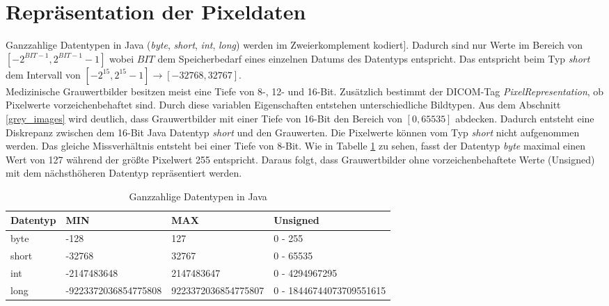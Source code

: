 \FloatBarrier
\section{Repräsentation der Pixeldaten}

Ganzzahlige Datentypen in Java (\textit{byte}, \textit{short}, \textit{int}, \textit{long}) werden im Zweierkomplement kodiert\cite[S.106]{java:insel}]. Dadurch sind nur Werte im Bereich von $[-2^{BIT-1}, 2^{BIT-1}-1]$ wobei $BIT$ dem Speicherbedarf eines einzelnen Datums des Datentyps entspricht. Das entspricht beim Typ \textit{short} dem Intervall von $[-2^{15}, 2^{15}-1] \rightarrow [-32768, 32767]$.\\
Medizinische Grauwertbilder besitzen meist eine Tiefe von 8-, 12- und 16-Bit. Zusätzlich bestimmt der DICOM-Tag \textit{PixelRepresentation}, ob Pixelwerte vorzeichenbehaftet sind. Durch diese variablen Eigenschaften entstehen unterschiedliche Bildtypen. Aus dem Abschnitt \ref{grey_images} wird deutlich, dass Grauwertbilder mit einer Tiefe von 16-Bit den Bereich von $[0,65535]$ abdecken. Dadurch entsteht eine Diskrepanz zwischen dem 16-Bit Java Datentyp \textit{short} und den Grauwerten. Die Pixelwerte können vom Typ \textit{short} nicht aufgenommen werden. Das gleiche Missverhältnis entsteht bei einer Tiefe von 8-Bit. Wie in Tabelle \ref{java:datentypen} zu sehen, fasst der Datentyp \textit{byte} maximal einen Wert von 127 während der größte Pixelwert 255 entspricht. Daraus folgt, dass Grauwertbilder ohne vorzeichenbehaftete Werte (Unsigned) mit dem nächsthöheren Datentyp repräsentiert werden.

\begin{table}
    \begin{tabularx}{\textwidth}{|X|X|X|X|}
    \toprule
    \hline
    \textbf{Datentyp}         & \textbf{MIN}    & \textbf{MAX}& \textbf{Unsigned} \\ \hline
    byte 		 			  & -128					& 127 		  & 0 - 255\\ \hline
    short 		 			  & -32768				& 32767 		  	  & 	0 - 65535\\ \hline
    int						  & -2147483648		& 2147483647 		  & 0 - 4294967295\\ \hline
    long 				      & \tiny{-9223372036854775808}			& \tiny{9223372036854775807} 		  & \tiny{0 - 18446744073709551615}\\ \hline

    \bottomrule
    \end{tabularx}
    \caption {Ganzzahlige Datentypen in Java}
    \label{java:datentypen}
\end{table}

